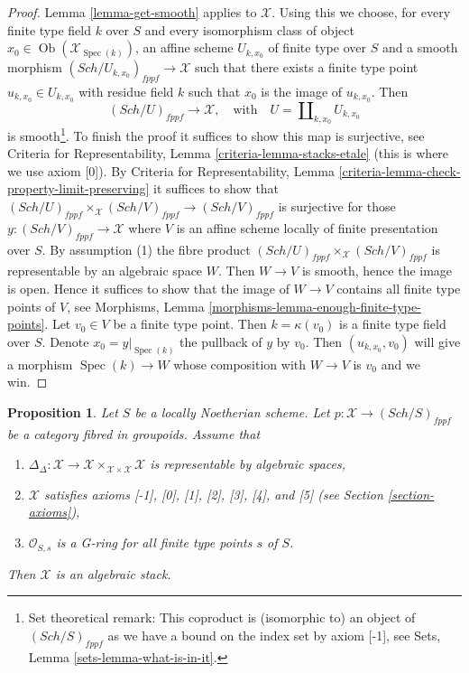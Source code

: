\documentclass{stacks-project}
\theoremstyle{plain}
\newtheorem{proposition}[subsection]{Proposition}
\theoremstyle{definition}
\theoremstyle{remark}
\numberwithin{equation}{subsection}
\def\Spec{\mathop{\mathrm{Spec}}}
\def\Sch{\mathit{Sch}}
\def\Ob{\mathop{\mathrm{Ob}}\nolimits}
\begin{document}
\begin{proof}
Lemma \ref{lemma-get-smooth} applies to $\mathcal{X}$. Using this we
choose, for every finite type field $k$ over $S$ and every
isomorphism class of object $x_0 \in \Ob(\mathcal{X}_{\Spec(k)})$,
an affine scheme $U_{k, x_0}$ of finite type over $S$ and a smooth morphism
$(\Sch/U_{k, x_0})_{fppf} \to \mathcal{X}$ such that there exists a finite
type point $u_{k, x_0} \in U_{k, x_0}$ with residue field $k$ such that $x_0$
is the image of $u_{k, x_0}$. Then
$$
(\Sch/U)_{fppf} \to \mathcal{X},
\quad\text{with}\quad
U = \coprod\nolimits_{k, x_0} U_{k, x_0}
$$
is smooth\footnote{Set theoretical remark: This coproduct is (isomorphic to)
an object of $(\Sch/S)_{fppf}$ as we have a bound on the index set
by axiom [-1], see Sets, Lemma \ref{sets-lemma-what-is-in-it}.}.
To finish the proof it suffices to show this map is surjective,
see Criteria for Representability, Lemma \ref{criteria-lemma-stacks-etale}
(this is where we use axiom [0]). By Criteria for Representability, Lemma
\ref{criteria-lemma-check-property-limit-preserving}
it suffices to show that
$(\Sch/U)_{fppf} \times_\mathcal{X} (\Sch/V)_{fppf} \to (\Sch/V)_{fppf}$
is surjective for those $y : (\Sch/V)_{fppf} \to \mathcal{X}$ where
$V$ is an affine scheme locally of finite presentation
over $S$. By assumption (1) the fibre product
$(\Sch/U)_{fppf} \times_\mathcal{X} (\Sch/V)_{fppf}$ is representable
by an algebraic space $W$. Then $W \to V$ is smooth, hence the image is
open. Hence it suffices to show that the image of $W \to V$ contains all
finite type points of $V$, see
Morphisms, Lemma \ref{morphisms-lemma-enough-finite-type-points}.
Let $v_0 \in V$ be a finite type point. Then $k = \kappa(v_0)$ is
a finite type field over $S$. Denote $x_0 = y|_{\Spec(k)}$
the pullback of $y$ by $v_0$. Then $(u_{k, x_0}, v_0)$ will give
a morphism $\Spec(k) \to W$ whose composition with $W \to V$
is $v_0$ and we win.
\end{proof}

\begin{proposition}
\label{proposition-second-diagonal-representable}
Let $S$ be a locally Noetherian scheme. Let
$p : \mathcal{X} \to (\Sch/S)_{fppf}$ be a category fibred in groupoids.
Assume that
\begin{enumerate}
\item $\Delta_\Delta : \mathcal{X} \to
\mathcal{X} \times_{\mathcal{X} \times \mathcal{X}} \mathcal{X}$
is representable by algebraic spaces,
\item $\mathcal{X}$ satisfies axioms [-1], [0], [1], [2], [3], [4], and [5]
(see Section \ref{section-axioms}),
\item $\mathcal{O}_{S, s}$ is a G-ring for all finite type points $s$ of $S$.
\end{enumerate}
Then $\mathcal{X}$ is an algebraic stack.
\end{proposition}
\end{document}
